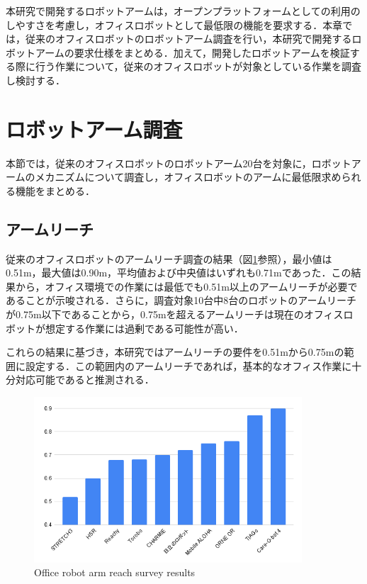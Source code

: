 本研究で開発するロボットアームは，オープンプラットフォームとしての利用のしやすさを考慮し，オフィスロボットとして最低限の機能を要求する．本章では，従来のオフィスロボットのロボットアーム調査を行い，本研究で開発するロボットアームの要求仕様をまとめる．加えて，開発したロボットアームを検証する際に行う作業について，従来のオフィスロボットが対象としている作業を調査し検討する．
\section{ロボットアーム調査}
本節では，従来のオフィスロボットのロボットアーム20台を対象に，ロボットアームのメカニズムについて調査し，オフィスロボットのアームに最低限求められる機能をまとめる．

\subsection{アームリーチ}
従来のオフィスロボットのアームリーチ調査の結果（図\ref{fig:reach}参照），最小値は0.51m，最大値は0.90m，平均値および中央値はいずれも0.71mであった．この結果から，オフィス環境での作業には最低でも0.51m以上のアームリーチが必要であることが示唆される．さらに，調査対象10台中8台のロボットのアームリーチが0.75m以下であることから，0.75mを超えるアームリーチは現在のオフィスロボットが想定する作業には過剰である可能性が高い．

これらの結果に基づき，本研究ではアームリーチの要件を0.51mから0.75mの範囲に設定する．この範囲内のアームリーチであれば，基本的なオフィス作業に十分対応可能であると推測される．
\begin{figure}[h]
  \centering
  \includegraphics[width=10cm]{images/2syou/reach.png}
  \caption{Office robot arm reach survey results}
  \label{fig:reach}
\end{figure}

